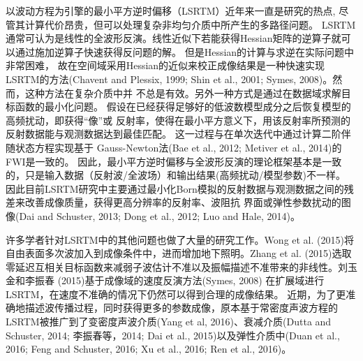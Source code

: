 以波动方程为引擎的最小平方逆时偏移（LSRTM）近年来一直是研究的热点,
尽管其计算代价昂贵，但可以处理复杂非均匀介质中所产生的多路径问题。
LSRTM通常可认为是线性的全波形反演。线性近似下若能获得Hessian矩阵的逆算子就可以通过施加逆算子快速获得反问题的解。
但是Hessian的计算与求逆在实际问题中非常困难，
故在空间域采用Hessian的近似来校正成像结果是一种快速实现LSRTM的方法(Chavent and Plessix, 
1999\cite{ChaventEtAl1999}; Shin et al., 2001\cite{shin2001improved}; Symes,
2008\cite{Symes2008})。然而，这种方法在复杂介质中并
不总是有效。另外一种方式是通过在数据域求解目标函数的最小化问题。
假设在已经获得足够好的低波数模型成分之后恢复模型的高频扰动，即获得“像”或
反射率，使得在最小平方意义下，用该反射率所预测的反射数据能与观测数据达到最佳匹配。
这一过程与在单次迭代中通过计算二阶伴随状态方程实现基于
Gauss-Newton法(Bae et al., 2012\cite{bae2012frequency}; Metiver et al.,
2014\cite{Metivier2014})的FWI是一致的。
因此，最小平方逆时偏移与全波形反演的理论框架基本是一致的，只是输入数据（反射波/全波场）和输出结果(高频扰动/模型参数)不一样。
因此目前LSRTM研究中主要通过最小化Born模拟的反射数据与观测数据之间的残差来改善成像质量，获得更高分辨率的反射率、波阻抗
界面或弹性参数扰动的图像(Dai and
Schuster, 2013\cite{Dai2013}; Dong et al., 2012\cite{Dong2012}; Luo and
Hale, 2014\cite{Luo2014})。

许多学者针对LSRTM中的其他问题也做了大量的研究工作。Wong et al.
(2015)\cite{WongEtAl2015}将自由表面多次波加入到成像条件中，进而增加地下照明。Zhang et al.
(2015)\cite{ZhangEtAl2015}选取零延迟互相关目标函数来减弱子波估计不准以及振幅描述不准带来的非线性。刘玉金和李振春
(2015)\cite{刘玉金2015}基于成像域的速度反演方法(Symes, 2008\cite{Symes2008a})
在扩展域进行LSRTM，在速度不准确的情况下仍然可以得到合理的成像结果。
近期，为了更准确地描述波传播过程，同时获得更多的参数成像，原本基于常密度声波方程的
LSRTM被推广到了变密度声波介质(Yang et al, 2016)\cite{Yang2016}、衰减介质(Dutta and
Schuster, 2014\cite{DuttaEtAl2014}; 李振春等，2014\cite{李振春2014}; Dai et al.,
2015\cite{Dai2015})以及弹性介质中(Duan et al., 2016\cite{Duan2016}; Feng and Schuster,
2016\cite{Feng2016}; Xu et al., 2016\cite{Xu2016}; Ren et al., 2016\cite{RenEtAl2016})。

